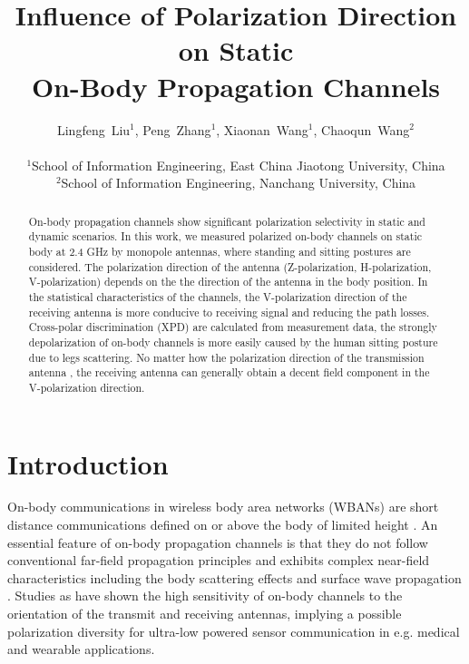 \documentclass[conference]{IEEEtran}
\begin{document}
\title{Influence of Polarization Direction on Static \\ On-Body Propagation Channels}
\author{Lingfeng~Liu$^1$, Peng~Zhang$^1$, Xiaonan~Wang$^1$, Chaoqun~Wang$^2$\\
\\
$^1$School of Information Engineering, East China Jiaotong University, China \\
$^2$School of Information Engineering,  Nanchang University, China}

\maketitle
\begin{abstract}
On-body propagation channels show significant polarization selectivity in static and dynamic scenarios. In this work, we measured polarized on-body channels on static body at 2.4 GHz by monopole antennas, where standing and sitting postures are considered. The polarization direction of the antenna (Z-polarization, H-polarization, V-polarization) depends on the the direction of the antenna in the body position. In the statistical characteristics of the channels, the V-polarization direction of the receiving antenna is more conducive to receiving signal and reducing the path losses. Cross-polar discrimination (XPD) are calculated from measurement data, the strongly depolarization of on-body channels is more easily caused by the human sitting posture due to legs scattering. No matter how the polarization direction of the transmission antenna , the receiving antenna can generally obtain a decent field component in the V-polarization direction.
\end{abstract}

\section{Introduction}
On-body communications in wireless body area networks (WBANs) are short distance communications defined on or above the body of limited height \cite{1}. An essential feature of on-body propagation channels is that they do not follow conventional far-field propagation principles and exhibits complex near-field characteristics including the body scattering effects\cite{2,3} and surface wave propagation \cite{5}. Studies as \cite{6} have shown the high sensitivity of on-body channels to the orientation of the transmit and receiving antennas, implying a possible polarization diversity for ultra-low powered sensor communication in e.g. medical and wearable applications. 
\end{document}
